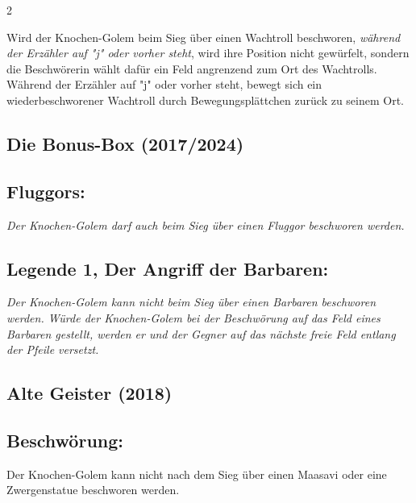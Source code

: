 \documentclass[10pt, a4paper, oneside]{book}
\newcommand{\fan}[1]{\textit{#1}}
\begin{document}
\begin{multicols*}{2}
\begin{bgcolor}
Wird der Knochen-Golem beim Sieg über einen Wachtroll beschworen, \fan{während der Erzähler auf "j" oder vorher steht}, wird ihre Position nicht gewürfelt, sondern die Beschwörerin wählt dafür ein Feld angrenzend zum Ort des Wachtrolls.  Während der Erzähler auf "j" oder vorher steht, bewegt sich ein wiederbeschworener Wachtroll durch Bewegungsplättchen zurück zu seinem Ort.
\supercite{dh-begleitheft}


\end{bgcolor}




\begin{bgcolor}[color-bb]
\section{Die Bonus-Box (2017/2024)}


\subsection{Fluggors:}

\fan{Der Knochen-Golem darf auch beim Sieg über einen Fluggor beschworen werden.}



\subsection{Legende 1, Der Angriff der Barbaren:}

\fan{Der Knochen-Golem kann nicht beim Sieg über einen Barbaren beschworen werden. Würde der Knochen-Golem bei der Beschwörung auf das Feld eines Barbaren gestellt, werden er und der Gegner auf das nächste freie Feld entlang der Pfeile versetzt.}

\end{bgcolor}




\begin{bgcolor}[color-ag]
\section{Alte Geister (2018)}


\subsection{Beschwörung:}

Der Knochen-Golem kann nicht nach dem Sieg über einen Maasavi oder eine Zwergenstatue beschworen werden.
\supercite{ag-begleitheft}


\end{bgcolor}
\end{multicols*}
\end{document}
